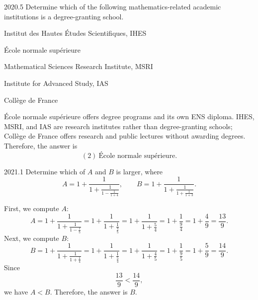     \begin{pastproblem}{2020.5}
        Determine which of the following mathematics-related academic institutions is a
        degree-granting school.
        \begin{problemchoices}
            \item Institut des Hautes Études Scientifiques, IHES
            \item École normale supérieure
            \item Mathematical Sciences Research Institute, MSRI
            \item Institute for Advanced Study, IAS
            \item Collège de France
        \end{problemchoices}
    \end{pastproblem}

    \begin{solution}
École normale supérieure offers degree programs and its own ENS diploma.
        IHES, MSRI, and IAS are research institutes rather than degree-granting
        schools; Collège de France offers research and public lectures without
        awarding degrees. Therefore, the answer is
        \[\boxed{(2)\ \text{École normale supérieure}}.\]
    \end{solution}

    \begin{pastproblem}{2021.1}
        Determine which of $A$ and $B$ is larger, where
        \[
            A
            =
            1+\frac{1}{1+\frac{1}{1-\frac{1}{1+4}}},
            \qquad
            B
            =
            1+\frac{1}{1+\frac{1}{1+\frac{1}{1+3}}}.
        \]
    \end{pastproblem}

    \begin{solution}
        First, we compute $A$:
        \[
            A
            =
            1+\frac{1}{1+\frac{1}{1-\frac{1}{5}}}
            =
            1+\frac{1}{1+\frac{1}{\frac{4}{5}}}
            =
            1+\frac{1}{1+\frac{5}{4}}
            =
            1+\frac{1}{\frac{9}{4}}
            =
            1+\frac{4}{9}
            =
            \frac{13}{9}.
        \]
        Next, we compute $B$:
        \[
            B
            =
            1+\frac{1}{1+\frac{1}{1+\frac{1}{4}}}
            =
            1+\frac{1}{1+\frac{1}{\frac{5}{4}}}
            =
            1+\frac{1}{1+\frac{4}{5}}
            =
            1+\frac{1}{\frac{9}{5}}
            =
            1+\frac{5}{9}
            =
            \frac{14}{9}.
        \]
        Since
        \[
            \frac{13}{9}<\frac{14}{9},
        \]
        we have $A<B$. Therefore, the answer is $\boxed{B}$.
    \end{solution}

